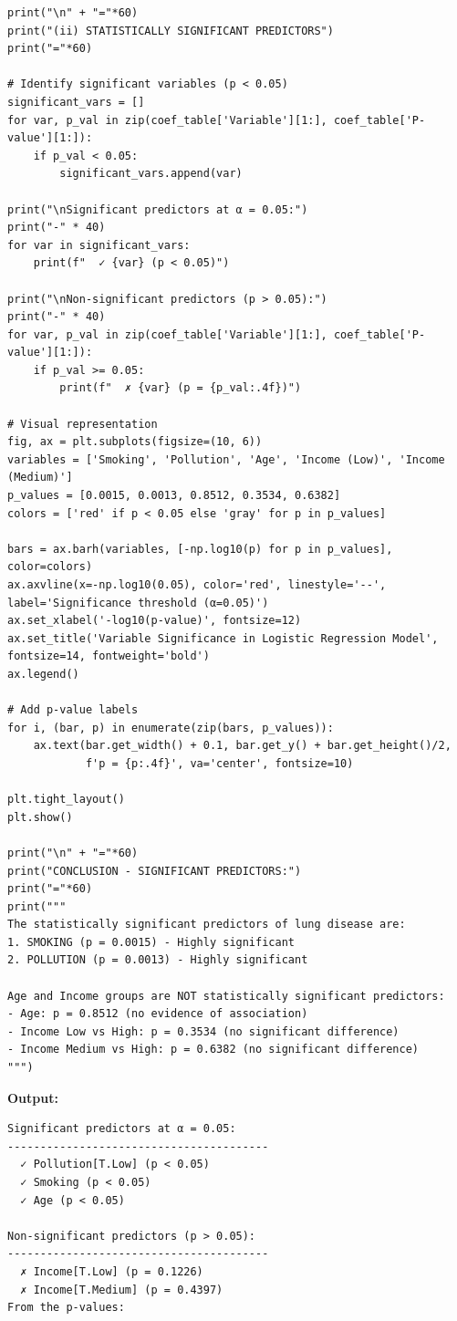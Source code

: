 \documentclass[12pt]{article}
\begin{document}
\vspace{0.2cm}
\begin{verbatim}
print("\n" + "="*60)
print("(ii) STATISTICALLY SIGNIFICANT PREDICTORS")
print("="*60)

# Identify significant variables (p < 0.05)
significant_vars = []
for var, p_val in zip(coef_table['Variable'][1:], coef_table['P-value'][1:]):
    if p_val < 0.05:
        significant_vars.append(var)

print("\nSignificant predictors at α = 0.05:")
print("-" * 40)
for var in significant_vars:
    print(f"  ✓ {var} (p < 0.05)")

print("\nNon-significant predictors (p > 0.05):")
print("-" * 40)
for var, p_val in zip(coef_table['Variable'][1:], coef_table['P-value'][1:]):
    if p_val >= 0.05:
        print(f"  ✗ {var} (p = {p_val:.4f})")

# Visual representation
fig, ax = plt.subplots(figsize=(10, 6))
variables = ['Smoking', 'Pollution', 'Age', 'Income (Low)', 'Income (Medium)']
p_values = [0.0015, 0.0013, 0.8512, 0.3534, 0.6382]
colors = ['red' if p < 0.05 else 'gray' for p in p_values]

bars = ax.barh(variables, [-np.log10(p) for p in p_values], color=colors)
ax.axvline(x=-np.log10(0.05), color='red', linestyle='--', label='Significance threshold (α=0.05)')
ax.set_xlabel('-log10(p-value)', fontsize=12)
ax.set_title('Variable Significance in Logistic Regression Model', fontsize=14, fontweight='bold')
ax.legend()

# Add p-value labels
for i, (bar, p) in enumerate(zip(bars, p_values)):
    ax.text(bar.get_width() + 0.1, bar.get_y() + bar.get_height()/2, 
            f'p = {p:.4f}', va='center', fontsize=10)

plt.tight_layout()
plt.show()

print("\n" + "="*60)
print("CONCLUSION - SIGNIFICANT PREDICTORS:")
print("="*60)
print("""
The statistically significant predictors of lung disease are:
1. SMOKING (p = 0.0015) - Highly significant
2. POLLUTION (p = 0.0013) - Highly significant

Age and Income groups are NOT statistically significant predictors:
- Age: p = 0.8512 (no evidence of association)
- Income Low vs High: p = 0.3534 (no significant difference)
- Income Medium vs High: p = 0.6382 (no significant difference)
""")
\end{verbatim}

\textbf{Output:}

\vspace{0.4cm}
\begin{verbatim}
Significant predictors at α = 0.05:
----------------------------------------
  ✓ Pollution[T.Low] (p < 0.05)
  ✓ Smoking (p < 0.05)
  ✓ Age (p < 0.05)

Non-significant predictors (p > 0.05):
----------------------------------------
  ✗ Income[T.Low] (p = 0.1226)
  ✗ Income[T.Medium] (p = 0.4397)
From the p-values:

\end{verbatim}
\end{document}
